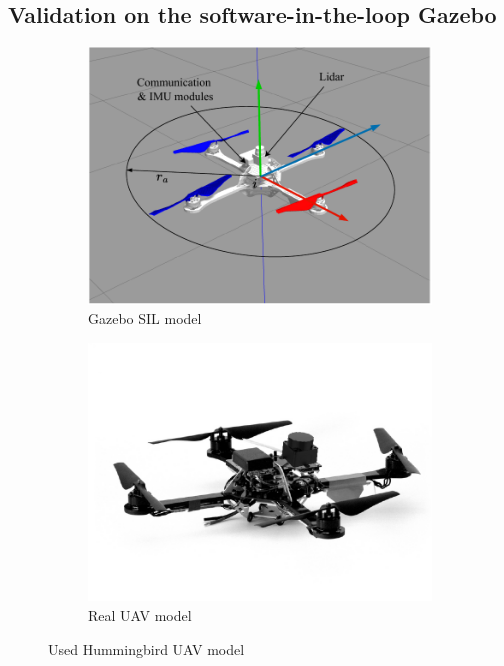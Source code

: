 \subsection{Validation on the software-in-the-loop Gazebo}
\begin{figure}[!]
    \centering
    \begin{subfigure}[b]{0.45\textwidth}
    \includegraphics[width=\textwidth]{paper2/images/gazebo_uav.pdf}
    \caption{Gazebo SIL model}
    \label{fig:1gazebo_uav}
    \end{subfigure}
    \begin{subfigure}[b]{0.44\textwidth}
    \includegraphics[width=\textwidth]{paper2/images/hummingbird.pdf}
    \caption{Real UAV model \cite{Furrer2016,Bui2022}}
    \label{fig:1gazebo_real}
    \end{subfigure}
    \caption{Used Hummingbird UAV model}
    \label{fig:1gazebo_setup}
\end{figure}

